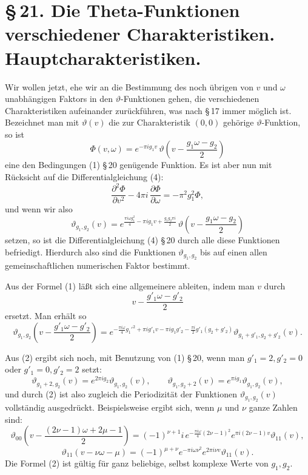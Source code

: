 \documentclass[11pt]{article}
\begin{document}
\section*{\S\,21. Die Theta-Funktionen verschiedener Charakteristiken. Hauptcharakteristiken.}

Wir wollen jetzt, ehe wir an die Bestimmung des noch übrigen von $v$ und $\omega$ unabhängigen Faktors in den $\vartheta$-Funktionen gehen, die verschiedenen Charakteristiken aufeinander zurückführen, was nach \S\,17 immer möglich ist. Bezeichnet man mit $\vartheta(v)$ die zur Charakteristik $(0,0)$ gehörige $\vartheta$-Funktion, so ist
\[
\Phi(v,\omega)=e^{-\pi i g_1 v}\,
\vartheta\!\left(v-\frac{g_1\omega-g_2}{2}\right)
\]
eine den Bedingungen (1) \S\,20 genügende Funktion. Es ist aber nun mit Rücksicht auf die Differentialgleichung (4):
\[
\frac{\partial^2\Phi}{\partial v^2}-4\pi i\,\frac{\partial\Phi}{\partial\omega}
=-\pi^2g_1^2\Phi,
\]
und wenn wir also
\begin{equation}
\vartheta_{g_1,g_2}(v)
=e^{\frac{\pi i\omega g_1^2}{4}-\pi i g_1v+\frac{g_1g_2\pi i}{2}}\,
\vartheta\!\left(v-\frac{g_1\omega-g_2}{2}\right)
\tag{1}
\end{equation}
setzen, so ist die Differentialgleichung (4) \S\,20 durch alle diese Funktionen befriedigt. Hierdurch also sind die Funktionen $\vartheta_{g_1,g_2}$ bis auf einen allen gemeinschaftlichen numerischen Faktor bestimmt.

Aus der Formel (1) läßt sich eine allgemeinere ableiten, indem man $v$ durch
\[
v-\frac{g'_1\omega-g'_2}{2}
\]
ersetzt. Man erhält so
\begin{equation}
\vartheta_{g_1,g_2}\!\left(v-\frac{g'_1\omega-g'_2}{2}\right)
=e^{-\frac{\pi i\omega}{4}g_1'^2+\pi i g'_1v-\pi i g_1g'_2-\frac{\pi i}{2}g'_1(g_2+g'_2)}
\vartheta_{g_1+g'_1,g_2+g'_2}(v).
\tag{2}
\end{equation}

Aus (2) ergibt sich noch, mit Benutzung von (1) \S\,20, wenn man $g'_1=2,g'_2=0$ oder $g'_1=0,g'_2=2$ setzt:
\begin{equation}
\vartheta_{g_1+2,g_2}(v)=e^{2\pi i g_2}\vartheta_{g_1,g_2}(v),\qquad
\vartheta_{g_1,g_2+2}(v)=e^{\pi i g_1}\vartheta_{g_1,g_2}(v),
\tag{3}
\end{equation}
und durch (2) ist also zugleich die Periodizität der Funktionen $\vartheta_{g_1,g_2}(v)$ vollständig ausgedrückt. Beispielsweise ergibt sich, wenn $\mu$ und $\nu$ ganze Zahlen sind:
\begin{equation}
\vartheta_{00}\!\left(v-\frac{(2\nu-1)\omega+2\mu-1}{2}\right)
=(-1)^{\nu+1}i\,e^{-\frac{\pi i\omega}{4}(2\nu-1)^2}e^{\pi i(2\nu-1)v}\vartheta_{11}(v),
\tag{4}
\end{equation}
\begin{equation}
\vartheta_{11}(v-\nu\omega-\mu)=(-1)^{\mu+\nu}e^{-\pi i\omega\nu^2}e^{2\pi i\nu v}\vartheta_{11}(v).
\tag{5}
\end{equation}
Die Formel (2) ist gültig für ganz beliebige, selbst komplexe Werte von $g_1,g_2$.
\end{document}
